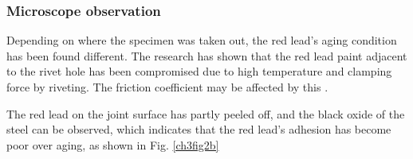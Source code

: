 \subsubsection{Microscope observation} \label{ch3sec2-1}

Depending on where the specimen was taken out, the red lead's aging condition has been found different. The research has shown that the red lead paint adjacent to the rivet hole has been compromised due to high temperature and clamping force by riveting. The friction coefficient may be affected by this \cite{Leonetti2020RivetBridges}.

The red lead on the joint surface has partly peeled off, and the black oxide of the steel can be observed, which indicates that the red lead's adhesion has become poor over aging, as shown in Fig. \ref{ch3fig2b}

